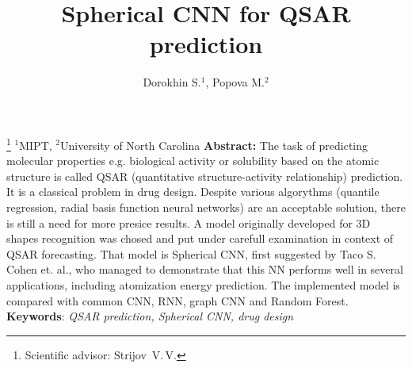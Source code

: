 \documentclass[12pt,twoside]{article}
\begin{document}
\title
{Spherical CNN for QSAR prediction}
\author
{Dorokhin S.$^1$, Popova M.$^2$} %
\thanks
{Scientific advisor:  Strijov~V.\,V.
}
\organization
{$^1$MIPT, $^2$University of North Carolina}
\abstract
{
    \textbf{Abstract:}
    The task of predicting molecular properties e.g. biological activity or solubility based on the atomic structure is called QSAR (quantitative structure-activity relationship) prediction.
    It is a classical problem in drug design.
    Despite various algorythms (quantile regression, radial basis function neural networks) are an acceptable solution, there is still a need for more presice results. 
    A model originally developed for 3D shapes recognition was chosed and put under carefull examination in context of QSAR forecasting.
    That model is Spherical CNN, first suggested by Taco S. Cohen et. al., who managed to demonstrate that this NN performs well in several applications, including atomization energy prediction.
    The implemented model is compared with common CNN, RNN, graph CNN and Random Forest.    
\bigskip
\\
\textbf{Keywords}: \emph {QSAR prediction, Spherical CNN, drug design}
}
\maketitle
\end{document}
